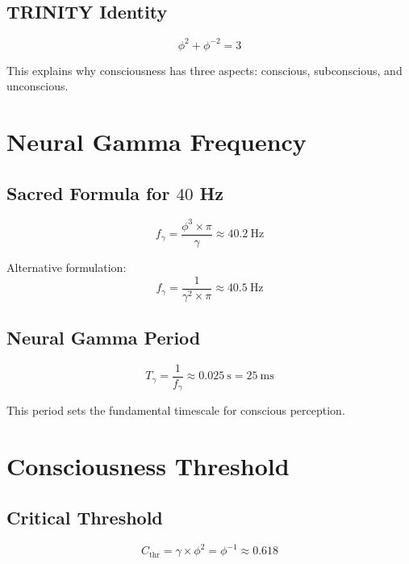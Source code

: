 \documentclass[12pt,a4paper]{article}
\begin{document}
\subsection{TRINITY Identity}

\begin{equation}
\phi^2 + \phi^{-2} = 3
\end{equation}

This explains why consciousness has three aspects: conscious, subconscious, and unconscious.

\section{Neural Gamma Frequency}

\subsection{Sacred Formula for $40$ Hz}

\begin{equation}
f_\gamma = \frac{\phi^3 \times \pi}{\gamma} \approx 40.2~\text{Hz}
\end{equation}

Alternative formulation:
\begin{equation}
f_\gamma = \frac{1}{\gamma^2 \times \pi} \approx 40.5~\text{Hz}
\end{equation}

\subsection{Neural Gamma Period}

\begin{equation}
T_\gamma = \frac{1}{f_\gamma} \approx 0.025~\text{s} = 25~\text{ms}
\end{equation}

This period sets the fundamental timescale for conscious perception.

\section{Consciousness Threshold}

\subsection{Critical Threshold}

\begin{equation}
C_{\text{thr}} = \gamma \times \phi^2 = \phi^{-1} \approx 0.618
\end{equation}
\end{document}
